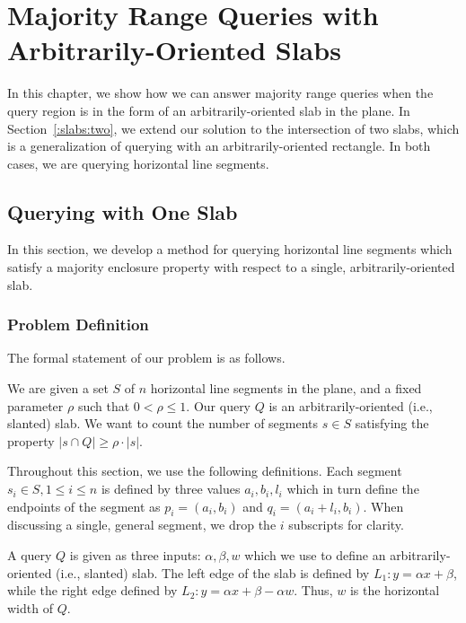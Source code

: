 \chapter{Majority Range Queries with Arbitrarily-Oriented Slabs}
\label{:slabs}

In this chapter, we show how we can answer majority range queries when the query region is in the form of an arbitrarily-oriented slab in the plane.  In Section~\ref{:slabs:two}, we extend our solution to the intersection of two slabs, which is a generalization of querying with an arbitrarily-oriented rectangle. In both cases, we are querying horizontal line segments.

\section{Querying with One Slab}
\label{:slabs:one}

In this section, we develop a method for querying horizontal line segments which satisfy a majority enclosure property with respect to a single, arbitrarily-oriented slab.


\subsection{Problem Definition}
\label{:slabs:one:problem-definition}

The formal statement of our problem is as follows.

\begin{problem}
We are given a set $S$ of $n$ horizontal line segments in the plane, and a fixed parameter $\rho$ such that $0 < \rho \leq 1$. Our query $Q$ is an arbitrarily-oriented (i.e., slanted) slab. We want to count the number of segments $s \in S$ satisfying the property $|s \cap Q| \geq \rho \cdot |s|$.
\end{problem}

Throughout this section, we use the following definitions. Each segment $s_i \in S, 1 \leq i \leq n$ is defined by three values $a_i, b_i, l_i$ which in turn define the endpoints of the segment as $p_i = (a_i, b_i)$ and $q_i = (a_i + l_i, b_i)$. When discussing a single, general segment, we drop the $i$ subscripts for clarity.

A query $Q$ is given as three inputs: $\alpha, \beta, w$ which we use to define an arbitrarily-oriented (i.e., slanted) slab. The left edge of the slab is defined by $L_1 : y = \alpha x + \beta$, while the right edge defined by $L_2: y = \alpha x + \beta - \alpha w$. Thus, $w$ is the horizontal width of $Q$.

